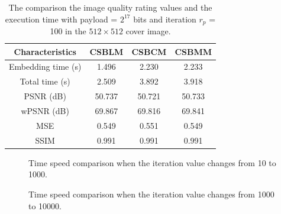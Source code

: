 \documentclass[conference]{IEEEtran}
\begin{document}
\begin{table}[htbp]
	\caption{The comparison the image quality rating values and the execution time with payload = \(2^{17}\) bits and iteration \(r_{p}\) = 100 in the \(512 \times 512\) cover image. }
	\centering
	\begin{tabular}{|c|c|c|c|}
		\hline
		\textbf{Characteristics}&\textbf{CSBLM}&\textbf{CSBCM}&\textbf{CSBMM}\\
		\cline{1-4}
		\hline
		Embedding time (s) & 1.496 & 2.230 & 2.233 \\
		Total time (s) & 2.509 & 3.892 & 3.918 \\
		PSNR (dB) & 50.737 & 50.721 & 50.733 \\
		wPSNR (dB) & 69.867 & 69.816 & 69.841 \\
		MSE & 0.549 & 0.551 & 0.549	\\
		SSIM & 0.991 & 0.991 & 0.991 \\
		\hline
	\end{tabular}
	\label{tab:512512Comparison}
\end{table}

\begin{figure}
\hfill
{}
\caption{Time speed comparison when the iteration value changes from 10 to 1000.}
\label{fig:timecomparison}
\end{figure}
\begin{figure}
\hfill
{}
\caption{Time speed comparison when the iteration value changes from 1000 to 10000.}
\label{fig:timecomparison}
\end{figure}
\end{document}
